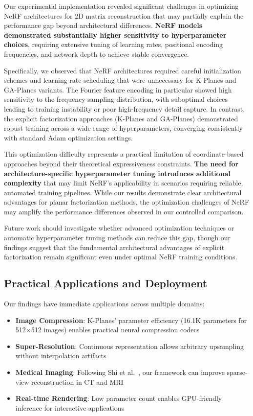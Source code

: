 \documentclass{article}
\begin{document}
Our experimental implementation revealed significant challenges in optimizing NeRF architectures for 2D matrix reconstruction that may partially explain the performance gap beyond architectural differences. \textbf{NeRF models demonstrated substantially higher sensitivity to hyperparameter choices}, requiring extensive tuning of learning rates, positional encoding frequencies, and network depth to achieve stable convergence.

Specifically, we observed that NeRF architectures required careful initialization schemes and learning rate scheduling that were unnecessary for K-Planes and GA-Planes variants. The Fourier feature encoding in particular showed high sensitivity to the frequency sampling distribution, with suboptimal choices leading to training instability or poor high-frequency detail capture. In contrast, the explicit factorization approaches (K-Planes and GA-Planes) demonstrated robust training across a wide range of hyperparameters, converging consistently with standard Adam optimization settings.

This optimization difficulty represents a practical limitation of coordinate-based approaches beyond their theoretical expressiveness constraints. \textbf{The need for architecture-specific hyperparameter tuning introduces additional complexity} that may limit NeRF's applicability in scenarios requiring reliable, automated training pipelines. While our results demonstrate clear architectural advantages for planar factorization methods, the optimization challenges of NeRF may amplify the performance differences observed in our controlled comparison.

Future work should investigate whether advanced optimization techniques or automatic hyperparameter tuning methods can reduce this gap, though our findings suggest that the fundamental architectural advantages of explicit factorization remain significant even under optimal NeRF training conditions.

\subsection{Practical Applications and Deployment}

Our findings have immediate applications across multiple domains:

\begin{itemize}
\item \textbf{Image Compression}: K-Planes' parameter efficiency (16.1K parameters for 512×512 images) enables practical neural compression codecs
\item \textbf{Super-Resolution}: Continuous representation allows arbitrary upsampling without interpolation artifacts
\item \textbf{Medical Imaging}: Following Shi et al.~\cite{shi2024inr}, our framework can improve sparse-view reconstruction in CT and MRI
\item \textbf{Real-time Rendering}: Low parameter count enables GPU-friendly inference for interactive applications
\end{itemize}
\end{document}
